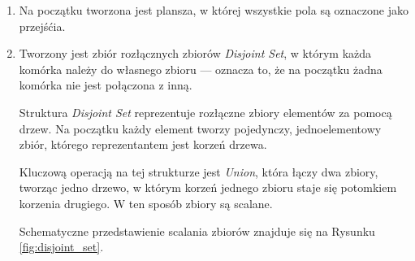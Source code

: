 \documentclass[12pt, a4paper]{article}
\begin{document}
\begin{enumerate}
\item Na początku tworzona jest plansza, w której wszystkie pola są oznaczone jako przejśćia.

\item Tworzony jest zbiór rozłącznych zbiorów \textit{Disjoint Set}, w którym każda komórka należy do własnego zbioru — oznacza to, że na początku żadna komórka nie jest połączona z inną.

Struktura \textit{Disjoint Set} reprezentuje rozłączne zbiory elementów za pomocą drzew. Na początku każdy element tworzy pojedynczy, jednoelementowy zbiór, którego reprezentantem jest korzeń drzewa.

Kluczową operacją na tej strukturze jest \textit{Union}, która łączy dwa zbiory, tworząc jedno drzewo, w którym korzeń jednego zbioru staje się potomkiem korzenia drugiego. W ten sposób zbiory są scalane.

Schematyczne przedstawienie scalania zbiorów znajduje się na Rysunku \ref{fig:disjoint_set}.

\begin{figure}[ht]
  \centering


\end{figure}
\end{enumerate}
\end{document}
